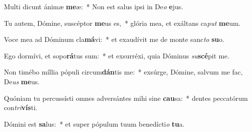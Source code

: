 \item Multi dicunt ánimæ \textbf{me}æ:~* Non est salus ipsi in De\textit{o} \textbf{e}jus.
\item Tu autem, Dómine, suscéptor \textbf{me}us es,~* glória mea, et exáltans ca\textit{put} \textbf{me}um.
\item Voce mea ad Dóminum cla\textbf{má}vi:~* et exaudívit me de monte sanc\textit{to} \textbf{su}o.
\item Ego dormívi, et sopo\textbf{rá}tus sum:~* et exsurréxi, quia Dóminus \textit{su}\textbf{scé}pit me.
\item Non timébo míllia pópuli circum\textbf{dán}tis me:~* exsúrge, Dómine, salvum me fac, De\textit{us} \textbf{me}us.
\item Quóniam tu percussísti omnes adversántes mihi sine \textbf{cau}sa:~* dentes peccatórum con\textit{tri}\textbf{vís}ti.
\item Dómini est \textbf{sa}lus:~* et super pópulum tuum benedícti\textit{o} \textbf{tu}a.
